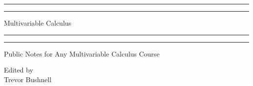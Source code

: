 \documentclass{package/notes}
\begin{document}
	\begin{titlepage} %
		
		\centering %
		
		\scshape %
		
		\vspace*{\baselineskip} %
		
		
		\rule{\textwidth}{1.6pt}\vspace*{-\baselineskip}\vspace*{2pt} %
		\rule{\textwidth}{0.4pt} %
		
		\vspace{0.75\baselineskip} %
		
		{\huge Multivariable Calculus\\} %
		
		\vspace{0.75\baselineskip} %
		
		\rule{\textwidth}{0.4pt}\vspace*{-\baselineskip}\vspace{3.2pt} %
		\rule{\textwidth}{1.6pt} %
		
		\vspace{2\baselineskip} %
		
		
		\LARGE{Public Notes for Any Multivariable Calculus Course} 
		
		\vspace*{3\baselineskip} %
		
		
		
		\vspace{0.5\baselineskip} 
		
		\vspace{0.5\baselineskip} 
		
		
		\vfill 
		
		
		
		\vspace{0.3\baselineskip} 
		
		
		{\large Edited by\\  Trevor Bushnell} 
		
	\end{titlepage}
	\tableofcontents
\end{document}
